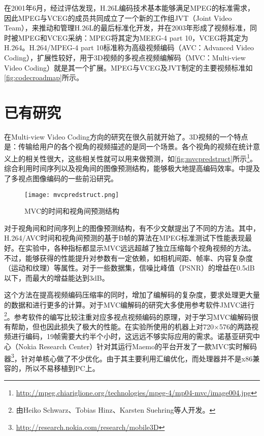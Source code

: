在2001年6月，经过评估发现，H.26L编码技术基本能够满足MPEG的标准需求，因此MPEG与VCEG的成员共同成立了一个新的工作组JVT（Joint Video Team），来推动和管理H.26L的最后标准化开发，并在2003年形成了视频标准，同时被MPEG和VCEG采纳：MPEG将其定为MEEG-4 part 10，VCEG将其定为H.264。H.264/MPEG-4 part 10标准称为高级视频编码（AVC：Advanced Video Coding），扩展性较好，用于3D视频的多视点视频编解码（MVC：Multi-view Video Coding）就是其一个扩展。MPEG与VCEG及JVT制定的主要视频标准如\autoref{fig:codecroadmap}所示。

\section{已有研究}
\label{sec:previouswork}


在Multi-view Video Coding方向的研究在很久前就开始了。3D视频的一个特点是：传输给用户的各个视角的视频描述的是同一个场景。各个视角的视频在统计意义上的相关性很大，这些相关性就可以用来做预测，如\autoref{fig:mvcpredstruct}所示\footnote{\url{http://mpeg.chiariglione.org/technologies/mpeg-4/mp04-mvc/image004.jpg}}。综合利用时间序列以及视角间的图像预测结构，能够极大地提高编码效率\cite{merkle2005statistical,kaup2006analysis}。中提及了多视点图像编码的一些前沿研究。
\begin{figure}[htbp]
\begin{center}
\texttt{[image: mvcpredstruct.png]}
\caption{MVC的时间和视角间预测结构}
\label{fig:mvcpredstruct}
\end{center}
\end{figure}

对于视角间和时间序列上的图像预测结构，有不少文献提出了不同的方法。其中，H.264/AVC时间和视角间预测的基于B帧的算法\cite{kaup2006analysis}在MPEG标准测试下性能表现最好\cite{flierl2007motion,merkle2006efficient,mueller2006multi,merkle2007efficient}。在实验中，各种指标都显示MVC远远超越了独立压缩每个视角视频的方法。不过，能够获得的性能提升对参数有一定依赖，如相机间距、帧率、内容复杂度（运动和纹理）等属性。对于一些数据集，信噪比峰值（PSNR）的增益在0.5dB以下，而最大的增益能达到3dB。

这个方法在提高视频编码压缩率的同时，增加了编解码的复杂度，要求处理更大量的数据和进行更多的计算。对于MVC编解码的研究大多使用参考软件JMVC进行\footnote{由Heiko Schwarz、Tobias Hinz、Karsten Suehring等人开发。}。参考软件的编写比较注重对应多视点视频编码的原理，对于学习MVC编解码很有帮助，但也因此损失了极大的性能。在实验所使用的机器上对720$\times$576的两路视频进行编码，19帧需要大约半个小时，这远远不够实际应用的需求。诺基亚研究中心（Nokia Research Center）针对其运行Maemo的平台开发了一款MVC实时解码器\footnote{\url{http://research.nokia.com/research/mobile3D}}，针对单核心做了不少优化。由于其主要利用汇编优化，而处理器并不是x86兼容的，所以不易移植到PC上。

